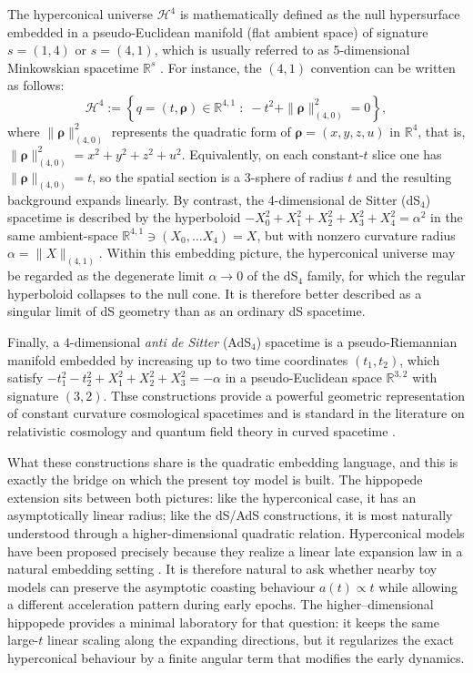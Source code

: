 \documentclass[11pt]{article}
\renewcommand{\vec}[1]{\boldsymbol{#1}}
\begin{document}
The hyperconical universe $\mathcal{H}^4$ is mathematically defined as the null hypersurface embedded in a pseudo-Euclidean manifold (flat ambient space) of signature $s=(1,4)$ or $s=(4,1)$, which is usually referred to as 5-dimensional Minkowskian spacetime $\mathbb{R}^s$ \cite{monjo2017hyperconical, Monjo_2024}. For instance, the $(4,1)$ convention can be written as follows:
\begin{equation}
\mathcal{H}^4:=\left\{q=(t,\vec{\rho})\in\mathbb{R}^{4,1}\;:\;-t^2+\|\vec{\rho}\|_{\scriptscriptstyle{(4,0)}}^2=0\right\},
\end{equation}where $\|\vec{\rho}\|_{\scriptscriptstyle{(4,0)}} ^2$ represents the quadratic form of $\vec{\rho} = (x,y,z,u)$ in $\mathbb{R}^4$, that is, $\|\vec{\rho}\|_{\scriptscriptstyle{(4,0)}} ^2 = x^2+y^2+z^2+u^2$. Equivalently, on each constant-$t$ slice one has $\|\vec{\rho}\|_{\scriptscriptstyle{(4,0)}} =t$, so the spatial section is a 3-sphere of radius $t$ and the resulting background expands linearly. By contrast, the 4-dimensional de Sitter (dS${}_4$) spacetime is described by the hyperboloid $-X_0^2+X_1^2+X_2^2+X_3^2+X_4^2=\alpha^2$ in the same ambient-space $\mathbb{R}^{4,1} \ni (X_0, \dots X_4) = X$, but with nonzero curvature radius $\alpha = \|X\|_{\scriptscriptstyle{(4,1)}}$. Within this embedding picture, the hyperconical universe may be regarded as the degenerate limit $\alpha\to0$ of the dS${}_4$ family, for which the regular hyperboloid collapses to the null cone. It is therefore better described as a singular limit of dS geometry than as an ordinary dS spacetime.

Finally, a $4$-dimensional \textit{anti de Sitter} (AdS${}_4$) spacetime is a pseudo-Riemannian manifold embedded by increasing up to two time coordinates $(t_1, t_2)$, which satisfy $-t_1^2-t_2^2+X_1^2+X_2^2+X_3^2 = - \alpha$ in a pseudo-Euclidean space $\mathbb{R}^{3,2}$ with signature $(3,2)$.  Thse constructions provide a powerful geometric representation of constant curvature cosmological spacetimes and is standard in the literature on relativistic cosmology and quantum field theory in curved spacetime \cite{hawking1973large, spradlin2001les}.

What these constructions share is the quadratic embedding language, and this is exactly the bridge on which the present toy model is built. The hippopede extension sits between both pictures: like the hyperconical case, it has an asymptotically linear radius; like the dS/AdS constructions, it is most naturally understood through a higher-dimensional quadratic relation. Hyperconical models have been proposed precisely because they realize a linear late expansion law in a natural embedding setting \cite{monjo2017hyperconical}. It is therefore natural to ask whether nearby toy models can preserve the asymptotic coasting behaviour $a(t)\propto t$ while allowing a different acceleration pattern during early epochs. The higher--dimensional hippopede provides a minimal laboratory for that question: it keeps the same large-$t$ linear scaling along the expanding directions, but it regularizes the exact hyperconical behaviour by a finite angular term that modifies the early dynamics.
\end{document}
